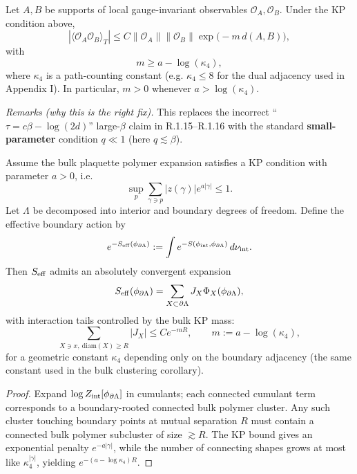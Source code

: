 \begin{corollary}
\label{thm:truncated-decay}
Let $A,B$ be supports of local gauge-invariant observables $\mathcal{O}_A,\mathcal{O}_B$. Under the KP condition above,
\[
|\langle \mathcal{O}_A \mathcal{O}_B\rangle_T| \le C \|\mathcal{O}_A\| \|\mathcal{O}_B\| \exp\big(-m\,d(A,B)\big),
\]
with
\[
m \ge a-\log(\kappa_4),
\]
where $\kappa_4$ is a path-counting constant (e.g. $\kappa_4\le 8$ for the dual adjacency used in Appendix I).
In particular, $m>0$ whenever $a>\log(\kappa_4)$.
\end{corollary}

\textit{Remarks (why this is the right fix).}
This replaces the incorrect ``$\tau=c\beta-\log(2d)$'' large-$\beta$ claim in R.1.15–R.1.16 with the standard \textbf{small-parameter} condition $q\ll1$ (here $q\lesssim \beta$).

\begin{theorem}
\label{thm:boundary-decay-hard}
Assume the bulk plaquette polymer expansion satisfies a KP condition with parameter $a>0$, i.e.
\[
\sup_{p}\sum_{\gamma\ni p} |z(\gamma)|e^{a|\gamma|}\le 1.
\]
Let $\Lambda$ be decomposed into interior and boundary degrees of freedom. Define the effective boundary action by
\[
e^{-S_{\rm eff}(\phi_{\partial\Lambda})}
:=\int e^{-S(\phi_{\rm int},\phi_{\partial\Lambda})}\,d\nu_{\rm int}.
\]
Then $S_{\rm eff}$ admits an absolutely convergent expansion
\[
S_{\rm eff}(\phi_{\partial\Lambda})=\sum_{X\subset\partial\Lambda} J_X \Phi_X(\phi_{\partial\Lambda}),
\]
with interaction tails controlled by the bulk KP mass:
\[
\sum_{X\ni x,\ \mathrm{diam}(X)\ge R} |J_X|
\le C e^{-mR},
\qquad m:=a-\log(\kappa_4),
\]
for a geometric constant $\kappa_4$ depending only on the boundary adjacency (the same constant used in the bulk clustering corollary).
\end{theorem}

\begin{proof}
Expand $\log Z_{\rm int}[\phi_{\partial\Lambda}]$ in cumulants; each connected cumulant term corresponds to a boundary-rooted connected bulk polymer cluster. Any such cluster touching boundary points at mutual separation $R$ must contain a connected bulk polymer subcluster of size $\gtrsim R$. The KP bound gives an exponential penalty $e^{-a|\gamma|}$, while the number of connecting shapes grows at most like $\kappa_4^{|\gamma|}$, yielding $e^{-(a-\log\kappa_4)R}$.
\end{proof}

